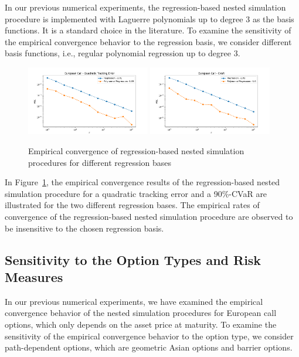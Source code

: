 In our previous numerical experiments, the regression-based nested simulation procedure is implemented with Laguerre polynomials up to degree $3$ as the basis functions.
It is a standard choice in the literature.
To examine the sensitivity of the empirical convergence behavior to the regression basis, we consider different basis functions, i.e., regular polynomial regression up to degree $3$.

\begin{figure}[ht!] 
    \centering
    \includegraphics[width=0.48\textwidth]{./project1/figures/figure13a.png}
    \includegraphics[width=0.48\textwidth]{./project1/figures/figure13b.png}
    \caption{Empirical convergence of regression-based nested simulation procedures for different regression bases}
    \label{fig1:sens_basis}
\end{figure}

In Figure~\ref{fig1:sens_basis}, the empirical convergence results of the regression-based nested simulation procedure for a quadratic tracking error and a 90\%-CVaR are illustrated for the two different regression bases.
The empirical rates of convergence of the regression-based nested simulation procedure are observed to be insensitive to the chosen regression basis.

\subsection{Sensitivity to the Option Types and Risk Measures} \label{sec1:sensitivity-option-type}

In our previous numerical experiments, we have examined the empirical convergence behavior of the nested simulation procedures for European call options, which only depends on the asset price at maturity.
To examine the sensitivity of the empirical convergence behavior to the option type, we consider path-dependent options, which are geometric Asian options and barrier options.

